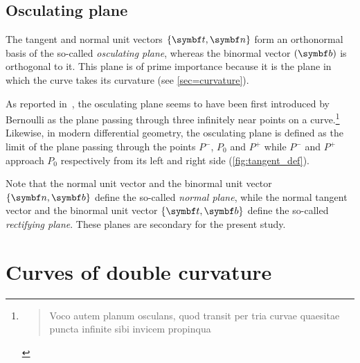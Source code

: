 \subsection{Osculating plane}\label{sec=osculatingplane}
The tangent and normal unit vectors $\{\vect{t},\vect{n}\}$ form an orthonormal basis of the so-called \emph{osculating plane}, whereas the binormal vector $(\vect{b})$ is orthogonal to it. This plane is of prime importance because it is the plane in which the curve takes its curvature (see \cref{sec=curvature}).

As reported in~\cite[p.45]{Delcourt2007}, the osculating plane seems to have been first introduced by Bernoulli as the plane passing through three infinitely near points on a curve.\footnote{\blockcquote[p.113]{Bernoulli1728}{Voco autem planum osculans, quod transit per tria curvae quaesitae puncta infinite sibi invicem propinqua}.
} Likewise, in modern differential geometry, the osculating plane is defined as the limit of the plane passing through the points $P^-$, $P_0$ and $P^+$ while $P^-$ and $P^+$ approach $P_0$ respectively from its left and right side (\cref{fig:tangent_def}).

Note that the normal unit vector and the binormal unit vector $\{\vect{n},\vect{b}\}$ define the so-called \emph{normal plane}, while the normal tangent vector and the binormal unit vector $\{\vect{t},\vect{b}\}$ define the so-called \emph{rectifying plane}. These planes are secondary for the present study.


\section{Curves of double curvature}\label{sec=curves_of_dc}


